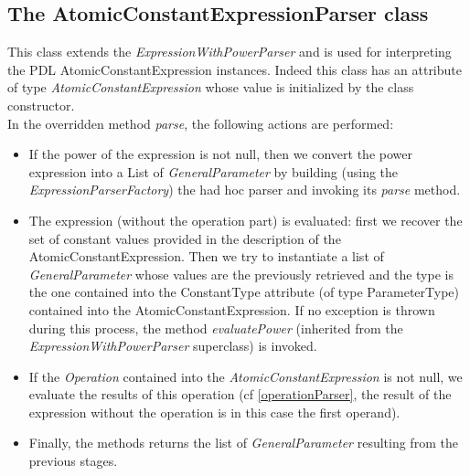 \documentclass[a4paper,11pt] {ivoa}
\begin{document}
\subsection{The AtomicConstantExpressionParser class}
This class extends the {\it ExpressionWithPowerParser} and is used for interpreting the PDL {AtomicConstantExpression} instances. Indeed this class has an attribute of type {\it AtomicConstantExpression} whose value is initialized by the class constructor.\\
In the overridden method {\it parse}, the following actions are performed:
\begin{itemize}
\item If the power of the expression is not null, then we convert the power expression into a List of {\it GeneralParameter} by building (using the {\it ExpressionParserFactory}) the had hoc parser and invoking its {\it parse} method.
\item The expression (without the operation part) is evaluated: first we recover the set of constant values provided in the description of  the AtomicConstantExpression. Then we try to instantiate a list of {\it GeneralParameter} whose values are the previously retrieved and the type is the one contained into the ConstantType attribute (of type ParameterType) contained into the AtomicConstantExpression. If no exception is thrown during this process, the method {\it evaluatePower} (inherited from the {\it ExpressionWithPowerParser} superclass) is invoked.
\item If the {\it Operation} contained into the {\it AtomicConstantExpression} is not null, we evaluate the results of this operation (cf \ref{operationParser}, the result of the expression without the operation is in this case the first operand).
\item Finally, the methods returns the list of {\it GeneralParameter} resulting from the previous stages.
\end{itemize}
\end{document}
